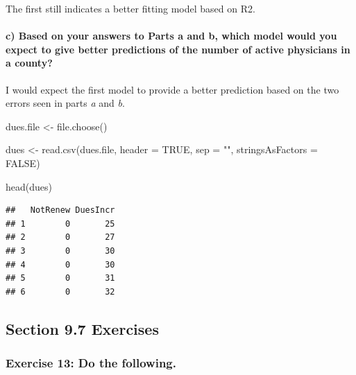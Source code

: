 \documentclass[
]{article}
\newenvironment{Shaded}{\begin{snugshade}}{\end{snugshade}}
\newcommand{\AttributeTok}[1]{\textcolor[rgb]{0.77,0.63,0.00}{#1}}
\newcommand{\ConstantTok}[1]{\textcolor[rgb]{0.00,0.00,0.00}{#1}}
\newcommand{\FunctionTok}[1]{\textcolor[rgb]{0.00,0.00,0.00}{#1}}
\newcommand{\NormalTok}[1]{#1}
\newcommand{\OtherTok}[1]{\textcolor[rgb]{0.56,0.35,0.01}{#1}}
\newcommand{\StringTok}[1]{\textcolor[rgb]{0.31,0.60,0.02}{#1}}
\begin{document}
\hfill\break
The first still indicates a better fitting model based on R2.

\hypertarget{c-based-on-your-answers-to-parts-a-and-b-which-model-would-you-expect-to-give-better-predictions-of-the-number-of-active-physicians-in-a-county}{%
\paragraph{c) Based on your answers to Parts a and b, which model would
you expect to give better predictions of the number of active physicians
in a
county?}\label{c-based-on-your-answers-to-parts-a-and-b-which-model-would-you-expect-to-give-better-predictions-of-the-number-of-active-physicians-in-a-county}}

\hfill\break
I would expect the first model to provide a better prediction based on
the two errors seen in parts \emph{a} and \emph{b}.

\begin{Shaded}
\begin{Highlighting}[]
\NormalTok{dues.file }\OtherTok{\textless{}{-}} \FunctionTok{file.choose}\NormalTok{()}

\NormalTok{dues }\OtherTok{\textless{}{-}} \FunctionTok{read.csv}\NormalTok{(dues.file, }\AttributeTok{header =} \ConstantTok{TRUE}\NormalTok{, }\AttributeTok{sep =} \StringTok{""}\NormalTok{, }\AttributeTok{stringsAsFactors =} \ConstantTok{FALSE}\NormalTok{)}

\FunctionTok{head}\NormalTok{(dues)}
\end{Highlighting}
\end{Shaded}

\begin{verbatim}
##   NotRenew DuesIncr
## 1        0       25
## 2        0       27
## 3        0       30
## 4        0       30
## 5        0       31
## 6        0       32
\end{verbatim}

\newpage

\hypertarget{section-9.7-exercises}{%
\subsection{Section 9.7 Exercises}\label{section-9.7-exercises}}

\hypertarget{exercise-13-do-the-following.}{%
\subsubsection{Exercise 13: Do the
following.}\label{exercise-13-do-the-following.}}
\end{document}
